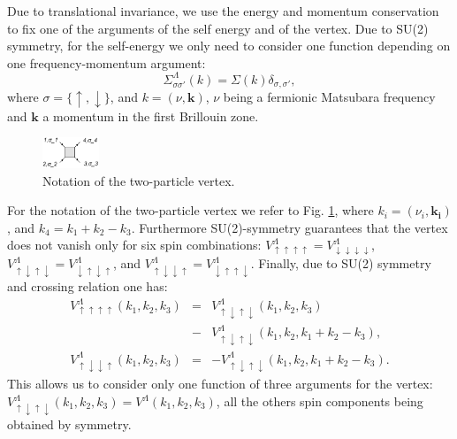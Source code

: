 Due to translational invariance, we use the energy and momentum conservation to fix one of the arguments of the self energy and of the vertex.  
Due to SU(2) symmetry, for the self-energy  we only need to consider one function depending on one frequency-momentum argument: 
\begin{equation}
\Sigma^\Lambda_{\sigma\sigma'}(k)=\Sigma(k)\delta_{\sigma,\sigma'}, 
\end{equation}
where $\sigma = \{\uparrow, \downarrow\} $, and $k=(\nu,\mathbf{k})$, $\nu$ being a fermionic Matsubara frequency and $\mathbf{k}$ a momentum in the first Brillouin zone. 
\begin{figure}
\includegraphics[width=0.15\textwidth]{images/VertexBox.png}
\caption{Notation of the two-particle vertex.
} 
\label{fig:notvert} 
\end{figure}

For the notation of the two-particle vertex we refer to Fig. \ref{fig:notvert}, where $k_i=(\nu_i,\mathbf{k_i})$,
 and $k_4=k_1+k_2-k_3$. 
Furthermore  SU(2)-symmetry guarantees that the vertex does not vanish only for six spin combinations\cite{Rohringer2012}:
$
 V^\Lambda_{\uparrow\uparrow\uparrow\uparrow} = V^\Lambda_{\downarrow\downarrow\downarrow\downarrow}$, 
$  V^\Lambda_{\uparrow\downarrow\uparrow\downarrow} = V^\Lambda_{\downarrow\uparrow\downarrow\uparrow}  $, and
$  V^\Lambda_{\uparrow\downarrow\downarrow\uparrow } = V^\Lambda_{\downarrow\uparrow\uparrow\downarrow}$.   
Finally, due to SU(2) symmetry and crossing relation one has: 
\begin{eqnarray}
\nonumber
V^\Lambda_{\uparrow\uparrow\uparrow\uparrow}(k_1,k_2,k_3) &=& V^\Lambda_{\uparrow\downarrow\uparrow\downarrow}(k_1,k_2,k_3)\\&-& V^\Lambda_{\uparrow\downarrow\uparrow\downarrow}(k_1,k_2,k_1+k_2-k_3), \\ 
V^\Lambda_{\uparrow\downarrow\downarrow\uparrow}(k_1,k_2,k_3)& =& -V^\Lambda_{\uparrow\downarrow\uparrow\downarrow}(k_1,k_2,k_1+k_2-k_3).
\end{eqnarray}
This allows us to consider only one function of three arguments for the vertex:  $V^\Lambda_{\uparrow\downarrow\uparrow\downarrow}(k_1,k_2,k_3)=V^\Lambda(k_1,k_2,k_3)$, all the others spin components being obtained by symmetry. 

